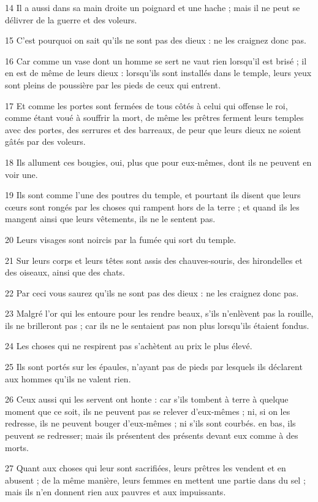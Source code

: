 \par 14 Il a aussi dans sa main droite un poignard et une hache ; mais il ne peut se délivrer de la guerre et des voleurs.
\par 15 C'est pourquoi on sait qu'ils ne sont pas des dieux : ne les craignez donc pas.
\par 16 Car comme un vase dont un homme se sert ne vaut rien lorsqu'il est brisé ; il en est de même de leurs dieux : lorsqu'ils sont installés dans le temple, leurs yeux sont pleins de poussière par les pieds de ceux qui entrent.
\par 17 Et comme les portes sont fermées de tous côtés à celui qui offense le roi, comme étant voué à souffrir la mort, de même les prêtres ferment leurs temples avec des portes, des serrures et des barreaux, de peur que leurs dieux ne soient gâtés par des voleurs.
\par 18 Ils allument ces bougies, oui, plus que pour eux-mêmes, dont ils ne peuvent en voir une.
\par 19 Ils sont comme l'une des poutres du temple, et pourtant ils disent que leurs cœurs sont rongés par les choses qui rampent hors de la terre ; et quand ils les mangent ainsi que leurs vêtements, ils ne le sentent pas.
\par 20 Leurs visages sont noircis par la fumée qui sort du temple.
\par 21 Sur leurs corps et leurs têtes sont assis des chauves-souris, des hirondelles et des oiseaux, ainsi que des chats.
\par 22 Par ceci vous saurez qu'ils ne sont pas des dieux : ne les craignez donc pas.
\par 23 Malgré l'or qui les entoure pour les rendre beaux, s'ils n'enlèvent pas la rouille, ils ne brilleront pas ; car ils ne le sentaient pas non plus lorsqu'ils étaient fondus.
\par 24 Les choses qui ne respirent pas s'achètent au prix le plus élevé.
\par 25 Ils sont portés sur les épaules, n'ayant pas de pieds par lesquels ils déclarent aux hommes qu'ils ne valent rien.
\par 26 Ceux aussi qui les servent ont honte : car s'ils tombent à terre à quelque moment que ce soit, ils ne peuvent pas se relever d'eux-mêmes ; ni, si on les redresse, ils ne peuvent bouger d'eux-mêmes ; ni s'ils sont courbés. en bas, ils peuvent se redresser; mais ils présentent des présents devant eux comme à des morts.
\par 27 Quant aux choses qui leur sont sacrifiées, leurs prêtres les vendent et en abusent ; de la même manière, leurs femmes en mettent une partie dans du sel ; mais ils n'en donnent rien aux pauvres et aux impuissants.
